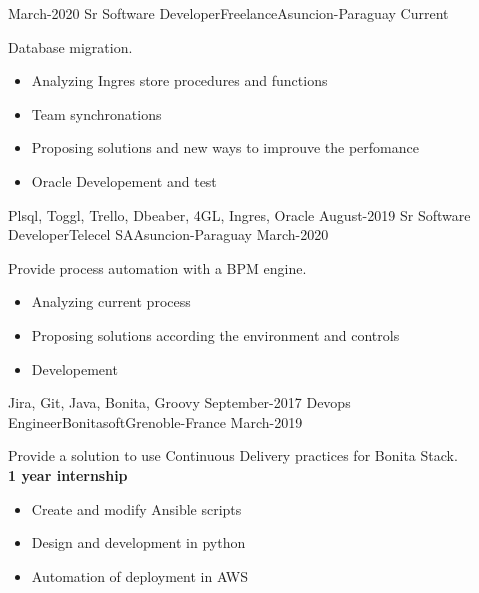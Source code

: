 %
%
%
\begin{experiences}
 \experience
    {March-2020}   {Sr Software Developer}{Freelance}{Asuncion-Paraguay}
    {Current} {Database migration.
                      \begin{itemize}
                          \item Analyzing Ingres store procedures and functions
                          \item Team synchronations
                          \item Proposing solutions and new ways to improuve the perfomance
                          \item Oracle Developement and test
                       \end{itemize}
                  }
                      {Plsql, Toggl, Trello, Dbeaber, 4GL, Ingres, Oracle}
  \emptySeparator
 \experience
    {August-2019}   {Sr Software Developer}{Telecel SA}{Asuncion-Paraguay}
    {March-2020} {Provide process automation with a BPM engine.
                      \begin{itemize}
                          \item Analyzing current process
                          \item Proposing solutions according the environment and controls
                          \item Developement
                       \end{itemize}
                  }
                      {Jira, Git, Java, Bonita, Groovy}
  \emptySeparator
  \experience
    {September-2017}   {Devops Engineer}{Bonitasoft}{Grenoble-France}
    {March-2019}
                    {Provide a solution to use Continuous Delivery practices for Bonita Stack. \\
                    \textbf{\small 1 year internship}
                    \begin{itemize}
                        \item Create and modify Ansible scripts
                        \item Design and development in python
                        \item Automation of deployment in AWS

\end{itemize}}
\end{experiences}
